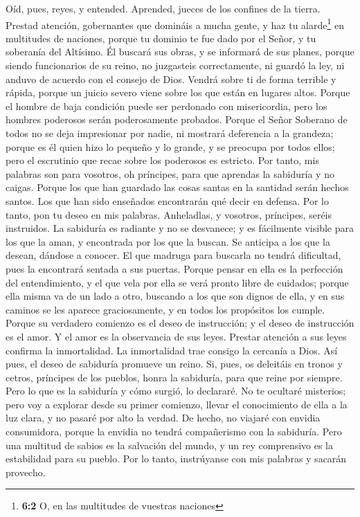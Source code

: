  Oíd, pues, reyes, y entended. Aprended, jueces de los
confines de la tierra.  Prestad atención, gobernantes que
domináis a mucha gente, y haz tu alarde\footnote{\textbf{6:2} O, en las
  multitudes de vuestras naciones} en multitudes de naciones,
 porque tu dominio te fue dado por el Señor, y tu
soberanía del Altísimo. Él buscará sus obras, y se informará de sus
planes,  porque siendo funcionarios de su reino, no
juzgasteis correctamente, ni guardó la ley, ni anduvo de acuerdo con el
consejo de Dios.  Vendrá sobre ti de forma terrible y
rápida, porque un juicio severo viene sobre los que están en lugares
altos.  Porque el hombre de baja condición puede ser
perdonado con misericordia, pero los hombres poderosos serán
poderosamente probados.  Porque el Señor Soberano de todos
no se deja impresionar por nadie, ni mostrará deferencia a la grandeza;
porque es él quien hizo lo pequeño y lo grande, y se preocupa por todos
ellos;  pero el escrutinio que recae sobre los poderosos
es estricto.  Por tanto, mis palabras son para vosotros,
oh príncipes, para que aprendas la sabiduría y no caigas.
 Porque los que han guardado las cosas santas en la
santidad serán hechos santos. Los que han sido enseñados encontrarán qué
decir en defensa.  Por lo tanto, pon tu deseo en mis
palabras. Anheladlas, y vosotros, príncipes, seréis instruidos.
 La sabiduría es radiante y no se desvanece; y es
fácilmente visible para los que la aman, y encontrada por los que la
buscan.  Se anticipa a los que la desean, dándose a
conocer.  El que madruga para buscarla no tendrá
dificultad, pues la encontrará sentada a sus puertas. 
Porque pensar en ella es la perfección del entendimiento, y el que vela
por ella se verá pronto libre de cuidados;  porque ella
misma va de un lado a otro, buscando a los que son dignos de ella, y en
sus caminos se les aparece graciosamente, y en todos los propósitos los
cumple.  Porque su verdadero comienzo es el deseo de
instrucción; y el deseo de instrucción es el amor.  Y el
amor es la observancia de sus leyes. Prestar atención a sus leyes
confirma la inmortalidad.  La inmortalidad trae consigo
la cercanía a Dios.  Así pues, el deseo de sabiduría
promueve un reino.  Si, pues, os deleitáis en tronos y
cetros, príncipes de los pueblos, honra la sabiduría, para que reine por
siempre.  Pero lo que es la sabiduría y cómo surgió, lo
declararé. No te ocultaré misterios; pero voy a explorar desde su primer
comienzo, llevar el conocimiento de ella a la luz clara, y no pasaré por
alto la verdad.  De hecho, no viajaré con envidia
consumidora, porque la envidia no tendrá compañerismo con la sabiduría.
 Pero una multitud de sabios es la salvación del mundo, y
un rey comprensivo es la estabilidad para su pueblo.  Por
lo tanto, instrúyanse con mis palabras y sacarán provecho.

